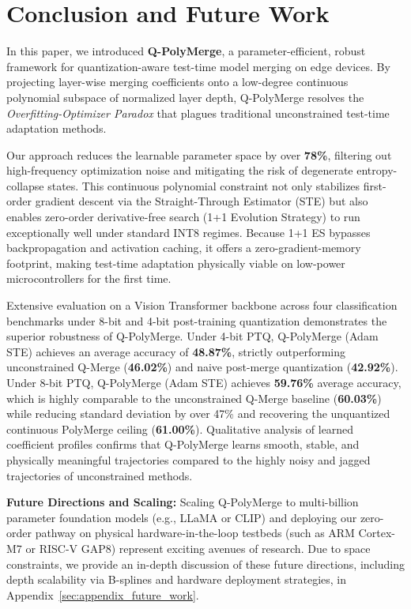 \section{Conclusion and Future Work}
\label{sec:conclusion}

In this paper, we introduced \textbf{Q-PolyMerge}, a parameter-efficient, robust framework for quantization-aware test-time model merging on edge devices. By projecting layer-wise merging coefficients onto a low-degree continuous polynomial subspace of normalized layer depth, Q-PolyMerge resolves the \emph{Overfitting-Optimizer Paradox} that plagues traditional unconstrained test-time adaptation methods. 

Our approach reduces the learnable parameter space by over \textbf{78\%}, filtering out high-frequency optimization noise and mitigating the risk of degenerate entropy-collapse states. This continuous polynomial constraint not only stabilizes first-order gradient descent via the Straight-Through Estimator (STE) but also enables zero-order derivative-free search (1+1 Evolution Strategy) to run exceptionally well under standard INT8 regimes. Because 1+1 ES bypasses backpropagation and activation caching, it offers a zero-gradient-memory footprint, making test-time adaptation physically viable on low-power microcontrollers for the first time.

Extensive evaluation on a Vision Transformer backbone across four classification benchmarks under 8-bit and 4-bit post-training quantization demonstrates the superior robustness of Q-PolyMerge. Under 4-bit PTQ, Q-PolyMerge (Adam STE) achieves an average accuracy of \textbf{48.87\%}, strictly outperforming unconstrained Q-Merge (\textbf{46.02\%}) and naive post-merge quantization (\textbf{42.92\%}). Under 8-bit PTQ, Q-PolyMerge (Adam STE) achieves \textbf{59.76\%} average accuracy, which is highly comparable to the unconstrained Q-Merge baseline (\textbf{60.03\%}) while reducing standard deviation by over 47\% and recovering the unquantized continuous PolyMerge ceiling (\textbf{61.00\%}). Qualitative analysis of learned coefficient profiles confirms that Q-PolyMerge learns smooth, stable, and physically meaningful trajectories compared to the highly noisy and jagged trajectories of unconstrained methods.

\textbf{Future Directions and Scaling:} Scaling Q-PolyMerge to multi-billion parameter foundation models (e.g., LLaMA or CLIP) and deploying our zero-order pathway on physical hardware-in-the-loop testbeds (such as ARM Cortex-M7 or RISC-V GAP8) represent exciting avenues of research. Due to space constraints, we provide an in-depth discussion of these future directions, including depth scalability via B-splines and hardware deployment strategies, in Appendix~\ref{sec:appendix_future_work}.